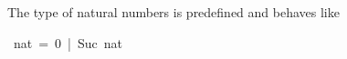 \begin{isabelle}%
%
\begin{isamarkuptext}%
\noindent
The type  of natural
numbers is predefined and behaves like%
\end{isamarkuptext}%
\ nat\ =\ 0\ |\ Suc\ nat\end{isabelle}%
